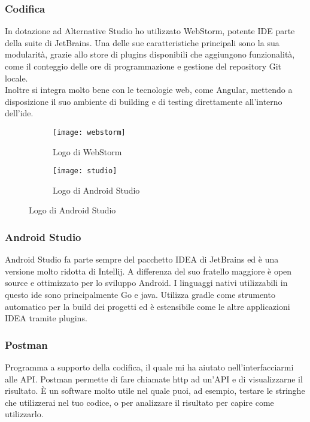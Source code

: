\subsubsection{Codifica}
In dotazione ad Alternative Studio ho utilizzato WebStorm, potente IDE parte della suite di JetBrains. Una delle sue caratteristiche
principali sono la sua modularità, grazie allo store di plugins disponibili che aggiungono funzionalità, come il conteggio delle ore di
programmazione e gestione del repository \gls{Git} locale. \\
Inoltre si integra molto bene con le tecnologie web, come Angular, mettendo a disposizione il suo ambiente di building e di testing direttamente all'interno dell'\acrshort{ide}.

\begin{figure}[htbp]
	\begin{subfigure}{0.5\textwidth}
		\texttt{[image: webstorm]}
		\caption{Logo di WebStorm}
	\end{subfigure}
	\begin{subfigure}{0.5\textwidth}
		\texttt{[image: studio]}
		\caption{Logo di Android Studio}
	\end{subfigure}
\end{figure}

\subsubsection{Android Studio}
Android Studio fa parte sempre del pacchetto IDEA di JetBrains ed è una versione molto ridotta di Intellij. A differenza del suo
fratello maggiore è open source e ottimizzato per lo sviluppo Android. I linguaggi nativi utilizzabili in questo \acrshort{ide} sono principalmente
\gls{Go} e \gls{java}. Utilizza gradle come strumento automatico per la build dei progetti ed è estensibile come le altre applicazioni IDEA
tramite plugins.

\subsubsection{Postman}
Programma a supporto della codifica, il quale mi ha aiutato nell'interfacciarmi alle API. Postman permette di fare chiamate \acrshort{http} ad
un'API e di visualizzarne il risultato. È un software molto utile nel quale puoi, ad esempio, testare le stringhe che utilizzerai nel tuo
codice, o per analizzare il risultato per capire come utilizzarlo.


